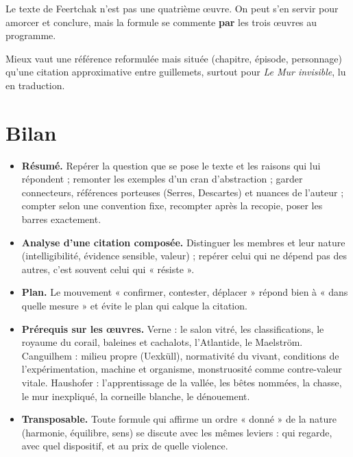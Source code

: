 \documentclass[11pt,a4paper]{article}
\providecommand{\tightlist}{\setlength{\itemsep}{0pt}\setlength{\parskip}{0pt}}
\begin{document}
\begin{piege}

Le texte de Feertchak n'est pas une quatrième œuvre. On peut s'en servir pour amorcer et conclure, mais la formule se commente \textbf{par} les trois œuvres au programme.

\end{piege}

\begin{piege}

Mieux vaut une référence reformulée mais située (chapitre, épisode, personnage) qu'une citation approximative entre guillemets, surtout pour \emph{Le Mur invisible}, lu en traduction.

\end{piege}

\hypertarget{bilan}{%
\section{Bilan}\label{bilan}}

\begin{itemize}
\tightlist
\item
  \textbf{Résumé.} Repérer la question que se pose le texte et les raisons qui lui répondent ; remonter les exemples d'un cran d'abstraction ; garder connecteurs, références porteuses (Serres, Descartes) et nuances de l'auteur ; compter selon une convention fixe, recompter après la recopie, poser les barres exactement.
\item
  \textbf{Analyse d'une citation composée.} Distinguer les membres et leur nature (intelligibilité, évidence sensible, valeur) ; repérer celui qui ne dépend pas des autres, c'est souvent celui qui « résiste ».
\item
  \textbf{Plan.} Le mouvement « confirmer, contester, déplacer » répond bien à « dans quelle mesure » et évite le plan qui calque la citation.
\item
  \textbf{Prérequis sur les œuvres.} Verne : le salon vitré, les classifications, le royaume du corail, baleines et cachalots, l'Atlantide, le Maelström. Canguilhem : milieu propre (Uexküll), normativité du vivant, conditions de l'expérimentation, machine et organisme, monstruosité comme contre-valeur vitale. Haushofer : l'apprentissage de la vallée, les bêtes nommées, la chasse, le mur inexpliqué, la corneille blanche, le dénouement.
\item
  \textbf{Transposable.} Toute formule qui affirme un ordre « donné » de la nature (harmonie, équilibre, sens) se discute avec les mêmes leviers : qui regarde, avec quel dispositif, et au prix de quelle violence.
\end{itemize}
\end{document}
